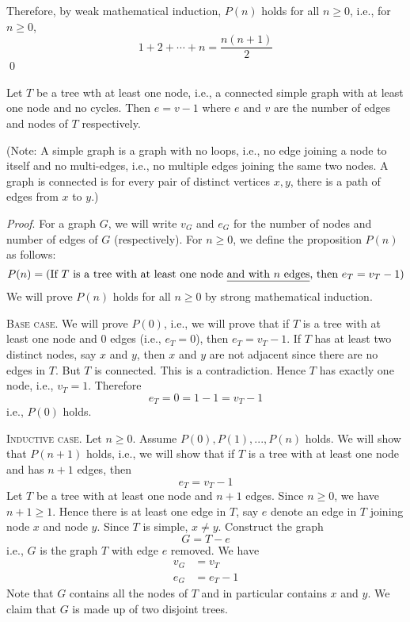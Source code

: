 Therefore, by weak mathematical induction,
$P(n)$ holds for all $n \geq 0$, i.e.,
for $n \geq 0$,
\[
  1 + 2 + \cdots + n = \frac{n(n + 1)}{2}
\]
\qed



\newpage
\begin{thm}
  Let $T$ be a tree wth at least one node,
  i.e., a connected simple graph with at least one node and no cycles.
  Then $e = v - 1$ where $e$ and $v$ are the number of edges and
  nodes of $T$ respectively.
\end{thm}

(Note: A simple graph is a graph with no loops, i.e., no edge
joining a node to itself and no multi-edges, i.e., no multiple edges
joining the same two nodes.
A graph is connected is for every pair of distinct vertices $x,y$,
there is a path of edges from $x$ to $y$.)

\textit{Proof}.
For a graph $G$, we will write $v_G$ and $e_G$ for the number of
nodes and number of edges of $G$ (respectively).
For $n \geq 0$, we define the proposition $P(n)$ as follows:
\[
  P(n) = 
  (
  \text{If $T$ is a tree with at least one node
  \underline{and with $n$ edges}, then $e_T = v_T - 1$}
  )
\]
We will prove $P(n)$ holds for all $n \geq 0$ by strong mathematical induction.

\textsc{Base case}.
We will prove $P(0)$, i.e., we will prove that
if $T$ is a tree with at least one node and 
$0$ edges (i.e., $e_T = 0$), then $e_T = v_T - 1$.
If $T$ has at least two distinct nodes,
say $x$ and $y$, then $x$ and $y$ are not adjacent since there are
no edges in $T$.
But $T$ is connected.
This is a contradiction.
Hence $T$ has exactly one node, i.e., $v_T = 1$.
Therefore
\[
e_T = 0 = 1 - 1 = v_T - 1
\]
i.e., $P(0)$ holds.

\textsc{Inductive case}.
Let $n \geq 0$.
Assume $P(0), P(1), ..., P(n)$ holds.
We will show that $P(n + 1)$ holds, i.e., we will show that
if $T$ is a tree with at least one node and has $n + 1$ edges, then
\[
  e_T = v_T - 1
\]
Let $T$ be a tree with at least one node and $n + 1$ edges.
Since $n \geq 0$, we have $n + 1 \geq 1$.
Hence there is at least one edge in $T$, say
$e$ denote an edge in $T$ joining node $x$ and node $y$.
Since $T$ is simple, $x \neq y$.
Construct the graph
\[
  G = T - e
\]
i.e., $G$ is the graph $T$ with edge $e$ removed.
We have
\begin{align*}
  v_G &= v_T \\
  e_G &= e_T - 1 
\end{align*}
Note that $G$ contains all the nodes of $T$ and in particular
contains $x$ and $y$.
We claim that $G$ is made up of two disjoint trees.

